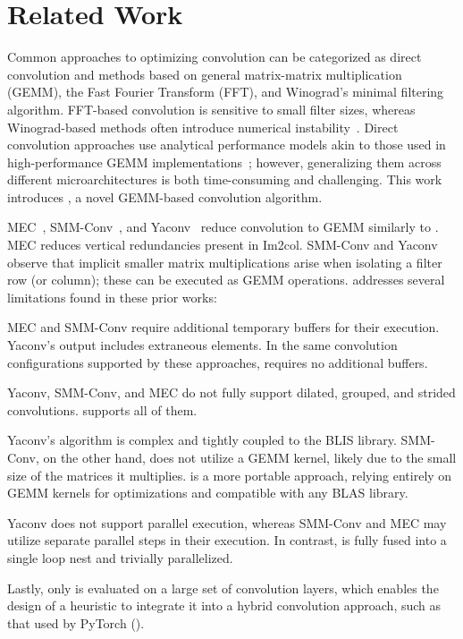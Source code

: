 \section{Related Work}

Common approaches to optimizing convolution can be categorized as direct convolution and methods based on general matrix-matrix multiplication (GEMM), the Fast Fourier Transform (FFT), and Winograd's minimal filtering algorithm.
FFT-based convolution is sensitive to small filter sizes, whereas Winograd-based methods often introduce numerical instability~\cite{Lavin2016,Zlateski2019,fast-conv-low-precision2024}.
Direct convolution approaches use analytical performance models akin to those used in high-performance GEMM implementations~\cite{Zhang2018,Zheng2020,Ferrari2023}; however, generalizing them across different microarchitectures is both time-consuming and challenging.
This work introduces \algname, a novel GEMM-based convolution algorithm.

MEC~\cite{Cho2017}, SMM-Conv~\cite{Ofir2022}, and Yaconv~\cite{Korostelev2023} reduce convolution to GEMM similarly to \algname.
MEC reduces vertical redundancies present in Im2col. 
SMM-Conv and Yaconv observe that implicit smaller matrix multiplications arise when isolating a filter row (or column); these can be executed as GEMM operations.
\algname addresses several limitations found in these prior works: 
\begin{enumerate*}[label=(\roman*)]
    \item MEC and SMM-Conv require additional temporary buffers for their execution.
    Yaconv's output includes extraneous elements.
    In the same convolution configurations supported by these approaches, \algname requires no additional buffers.

    \item Yaconv, SMM-Conv, and MEC do not fully support dilated, grouped, and strided convolutions.
    \algname supports all of them.
    
    \item Yaconv's algorithm is complex and tightly coupled to the BLIS library.
    SMM-Conv, on the other hand, does not utilize a GEMM kernel, likely due to the small size of the matrices it multiplies.
    \algname is a more portable approach, relying entirely on GEMM kernels for optimizations and compatible with any BLAS library.

    \item Yaconv does not support parallel execution, whereas SMM-Conv and MEC may utilize separate parallel steps in their execution. In contrast, \algname is fully fused into a single loop nest and trivially parallelized.
    
    \item Lastly, only \algname is evaluated on a large set of convolution layers, which enables the design of a heuristic to integrate it into a hybrid convolution approach, such as that used by PyTorch ().
\end{enumerate*}

